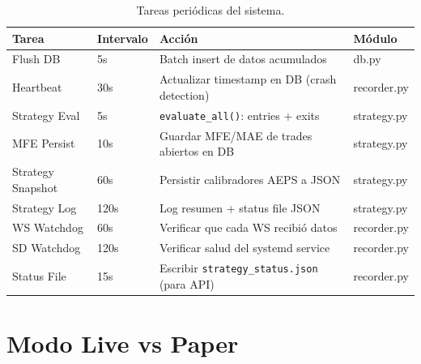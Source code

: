 \documentclass[11pt,a4paper]{article}
\newcommand{\code}[1]{\texttt{\small #1}}
\begin{document}
\begin{table}[H]
\centering
\caption{Tareas peri\'odicas del sistema.}
\label{tab:periodic}
\begin{tabularx}{\textwidth}{llXl}
\toprule
\textbf{Tarea} & \textbf{Intervalo} & \textbf{Acci\'on} & \textbf{M\'odulo} \\
\midrule
Flush DB & 5s & Batch insert de datos acumulados & db.py \\
Heartbeat & 30s & Actualizar timestamp en DB (crash detection) & recorder.py \\
Strategy Eval & 5s & \code{evaluate\_all()}: entries + exits & strategy.py \\
MFE Persist & 10s & Guardar MFE/MAE de trades abiertos en DB & strategy.py \\
Strategy Snapshot & 60s & Persistir calibradores AEPS a JSON & strategy.py \\
Strategy Log & 120s & Log resumen + status file JSON & strategy.py \\
WS Watchdog & 60s & Verificar que cada WS recibi\'o datos & recorder.py \\
SD Watchdog & 120s & Verificar salud del systemd service & recorder.py \\
Status File & 15s & Escribir \code{strategy\_status.json} (para API) & recorder.py \\
\bottomrule
\end{tabularx}
\end{table}


\section{Modo Live vs Paper}
\label{sec:modes}
\end{document}
